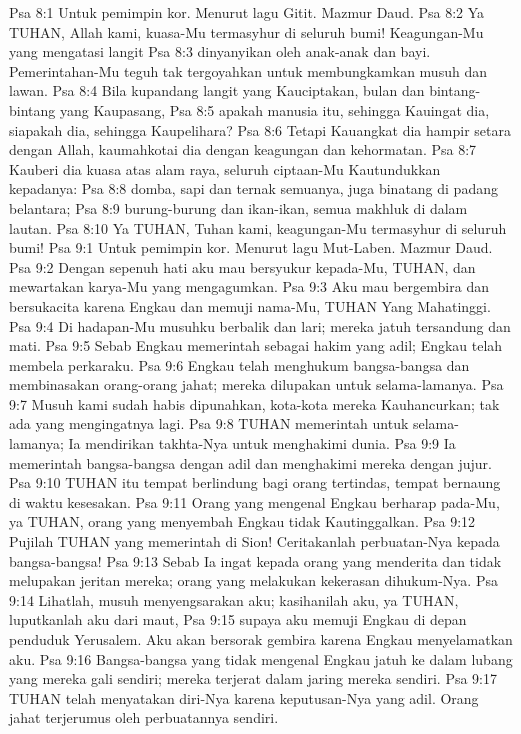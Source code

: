 Psa 8:1  Untuk pemimpin kor. Menurut lagu Gitit. Mazmur Daud.
Psa 8:2  Ya TUHAN, Allah kami, kuasa-Mu termasyhur di seluruh bumi! Keagungan-Mu yang mengatasi langit
Psa 8:3  dinyanyikan oleh anak-anak dan bayi. Pemerintahan-Mu teguh tak tergoyahkan untuk membungkamkan musuh dan lawan.
Psa 8:4  Bila kupandang langit yang Kauciptakan, bulan dan bintang-bintang yang Kaupasang,
Psa 8:5  apakah manusia itu, sehingga Kauingat dia, siapakah dia, sehingga Kaupelihara?
Psa 8:6  Tetapi Kauangkat dia hampir setara dengan Allah, kaumahkotai dia dengan keagungan dan kehormatan.
Psa 8:7  Kauberi dia kuasa atas alam raya, seluruh ciptaan-Mu Kautundukkan kepadanya:
Psa 8:8  domba, sapi dan ternak semuanya, juga binatang di padang belantara;
Psa 8:9  burung-burung dan ikan-ikan, semua makhluk di dalam lautan.
Psa 8:10  Ya TUHAN, Tuhan kami, keagungan-Mu termasyhur di seluruh bumi!
Psa 9:1  Untuk pemimpin kor. Menurut lagu Mut-Laben. Mazmur Daud.
Psa 9:2  Dengan sepenuh hati aku mau bersyukur kepada-Mu, TUHAN, dan mewartakan karya-Mu yang mengagumkan.
Psa 9:3  Aku mau bergembira dan bersukacita karena Engkau dan memuji nama-Mu, TUHAN Yang Mahatinggi.
Psa 9:4  Di hadapan-Mu musuhku berbalik dan lari; mereka jatuh tersandung dan mati.
Psa 9:5  Sebab Engkau memerintah sebagai hakim yang adil; Engkau telah membela perkaraku.
Psa 9:6  Engkau telah menghukum bangsa-bangsa dan membinasakan orang-orang jahat; mereka dilupakan untuk selama-lamanya.
Psa 9:7  Musuh kami sudah habis dipunahkan, kota-kota mereka Kauhancurkan; tak ada yang mengingatnya lagi.
Psa 9:8  TUHAN memerintah untuk selama-lamanya; Ia mendirikan takhta-Nya untuk menghakimi dunia.
Psa 9:9  Ia memerintah bangsa-bangsa dengan adil dan menghakimi mereka dengan jujur.
Psa 9:10  TUHAN itu tempat berlindung bagi orang tertindas, tempat bernaung di waktu kesesakan.
Psa 9:11  Orang yang mengenal Engkau berharap pada-Mu, ya TUHAN, orang yang menyembah Engkau tidak Kautinggalkan.
Psa 9:12  Pujilah TUHAN yang memerintah di Sion! Ceritakanlah perbuatan-Nya kepada bangsa-bangsa!
Psa 9:13  Sebab Ia ingat kepada orang yang menderita dan tidak melupakan jeritan mereka; orang yang melakukan kekerasan dihukum-Nya.
Psa 9:14  Lihatlah, musuh menyengsarakan aku; kasihanilah aku, ya TUHAN, luputkanlah aku dari maut,
Psa 9:15  supaya aku memuji Engkau di depan penduduk Yerusalem. Aku akan bersorak gembira karena Engkau menyelamatkan aku.
Psa 9:16  Bangsa-bangsa yang tidak mengenal Engkau jatuh ke dalam lubang yang mereka gali sendiri; mereka terjerat dalam jaring mereka sendiri.
Psa 9:17  TUHAN telah menyatakan diri-Nya karena keputusan-Nya yang adil. Orang jahat terjerumus oleh perbuatannya sendiri.
